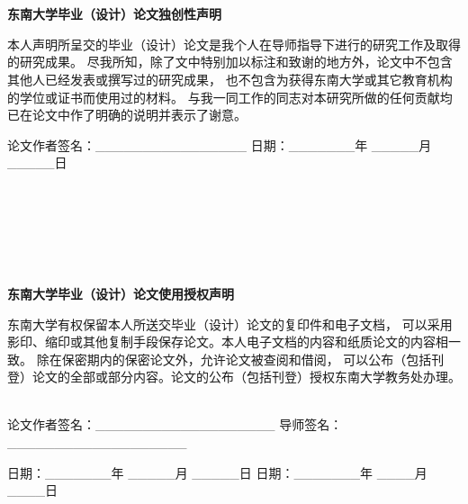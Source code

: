 
\renewcommand{\baselinestretch}{1.25} %

\newpage
\hei\xiaoer
~\\
~\\

\begin{center}
    \textbf{东南大学毕业（设计）论文独创性声明}
\end{center}

\hspace{21pt}
\song\xiaosi

本人声明所呈交的毕业（设计）论文是我个人在导师指导下进行的研究工作及取得的研究成果。
尽我所知，除了文中特别加以标注和致谢的地方外，论文中不包含其他人已经发表或撰写过的研究成果，
也不包含为获得东南大学或其它教育机构的学位或证书而使用过的材料。
与我一同工作的同志对本研究所做的任何贡献均已在论文中作了明确的说明并表示了谢意。

\hspace{18pt}

\setlength{\parindent}{4em}

{论文作者签名：\_\_\_\_\_\_\_\_\_\_\_\_\_\_\_\_ \vspace{1.5em} 
日期：\_\_\_\_\_\_\_年 \_\_\_\_\_月 \_\_\_\_\_日}

\setlength{\parindent}{2em}
~\\~\\~\\~\\~\\

\begin{center}
    \hei\xiaoer
    \textbf{东南大学毕业（设计）论文使用授权声明}
\end{center}

东南大学有权保留本人所送交毕业（设计）论文的复印件和电子文档，
可以采用影印、缩印或其他复制手段保存论文。本人电子文档的内容和纸质论文的内容相一致。
除在保密期内的保密论文外，允许论文被查阅和借阅，
可以公布（包括刊登）论文的全部或部分内容。论文的公布（包括刊登）授权东南大学教务处办理。

~\\

论文作者签名：\_\_\_\_\_\_\_\_\_\_\_\_\_\_\_\_\_\_\_  \hspace{1.5em} 导师签名：\_\_\_\_\_\_\_\_\_\_\_\_\_\_\_\_\_\_\_

日期：\_\_\_\_\_\_\_年 \_\_\_\_\_月 \_\_\_\_\_日 \hspace{2.2em} 日期：\_\_\_\_\_\_\_年 \_\_\_\_月 \_\_\_\_日
\thispagestyle{empty}
